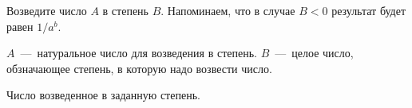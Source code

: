 Возведите число $A$ в степень $B$. Напоминаем, что в случае $B < 0$ результат будет равен $1/a^b$.

\InputFile

$A$~---~натуральное число для возведения в степень. $B$~---~целое число, обзначающее степень, в которую надо возвести число.

\OutputFile

Число возведенное в заданную степень.

\SAMPLES

